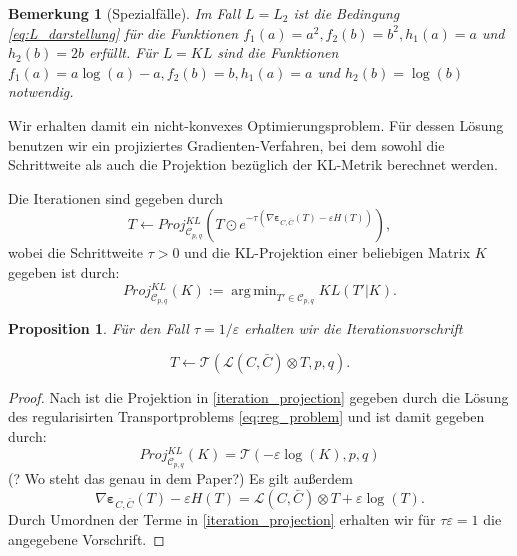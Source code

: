 \documentclass[11pt,a4paper]{article}
\DeclareMathOperator*{\argmin}{arg\,min}
\newtheorem{proposition}[theorem]{Proposition}
\newtheorem{remark}[theorem]{Bemerkung}
\numberwithin{equation}{section}
\begin{document}
	\begin{remark}[Spezialfälle]
		Im Fall $L=L_2$ ist die Bedingung \autoref{eq:L_darstellung} für die Funktionen $f_1(a) = a^2, f_2(b) = b^2, h_1(a) = a$ und $h_2(b) = 2b$ erfüllt.
		Für $L=KL$ sind die Funktionen $f_1(a) = a \log (a) -a, f_2(b) = b, h_1(a) =a $ und $h_2(b) = \log (b)$ notwendig.
	\end{remark}
	
	
	

	
	Wir erhalten damit ein nicht-konvexes Optimierungsproblem. Für dessen Lösung benutzen wir ein projiziertes Gradienten-Verfahren, bei dem sowohl die Schrittweite als auch die Projektion bezüglich der KL-Metrik berechnet werden.
	
	Die Iterationen sind gegeben durch
	\begin{equation}
	T \leftarrow Proj_{\mathcal{C}_{p,q}}^{KL} \left(T \odot e^{-\tau( \nabla \boldsymbol{\varepsilon}_{C, \bar{C}}(T) -\varepsilon H(T))} \right), \label{iteration_projection}
	\end{equation}
	wobei die Schrittweite $\tau > 0$ und die KL-Projektion einer beliebigen Matrix $K$ gegeben ist durch:
	\begin{equation}
	Proj_{\mathcal{C}_{p,q}}^{KL}(K) := \argmin_{T' \in \mathcal{C}_{p,q}} KL(T'|K).
	\end{equation}
	
	\begin{proposition} \label{prop:iteration_GW_eps}
		Für den Fall $\tau= 1/\varepsilon$ erhalten wir die Iterationsvorschrift
		
		\begin{equation}
		T \leftarrow \mathcal{T}(\mathcal{L} (C, \bar{C}) \otimes T,p,q). \label{simple_iteration}
		\end{equation}
	\end{proposition}
	\begin{proof}
		Nach \cite{iterative_bregman_projections} ist die Projektion in \ref{iteration_projection} gegeben durch die Lösung des regularisirten Transportproblems \ref{eq:reg_problem} und ist damit gegeben durch:
		\begin{equation}
		Proj_{\mathcal{C}_{p,q}}^{KL}(K) = \mathcal{T}(-\varepsilon \log (K), p, q)
		\end{equation}
		(? Wo steht das genau in dem Paper?)
		Es gilt außerdem
		\begin{equation}
		\nabla \boldsymbol{\varepsilon}_{C, \bar{C}}(T) -\varepsilon H(T) = \mathcal{L}(C,\bar{C}) \otimes T + \varepsilon\log (T).
		\end{equation}
		Durch Umordnen der Terme in \autoref{iteration_projection} erhalten wir für $\tau \varepsilon = 1$ die angegebene Vorschrift.
	\end{proof}
	
\end{document}
